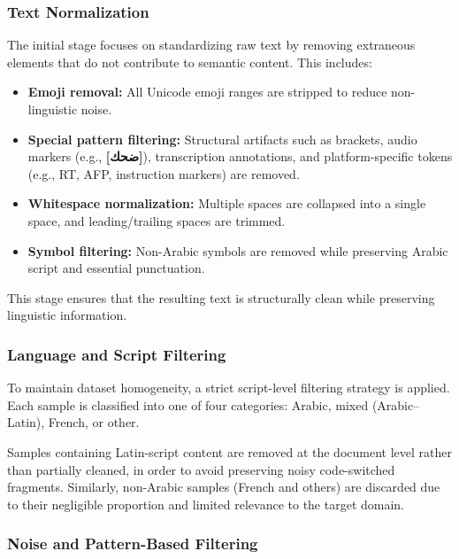 \documentclass[12pt,a4paper]{report}
\begin{document}
\subsubsection{Text Normalization}

The initial stage focuses on standardizing raw text by removing extraneous elements that do not contribute to semantic content. This includes:

\begin{itemize}
    \item \textbf{Emoji removal:} All Unicode emoji ranges are stripped to reduce non-linguistic noise.
    \item \textbf{Special pattern filtering:} Structural artifacts such as brackets, audio markers (e.g., \textbf{[ضحك]}), transcription annotations, and platform-specific tokens (e.g., RT, AFP, instruction markers) are removed.
    \item \textbf{Whitespace normalization:} Multiple spaces are collapsed into a single space, and leading/trailing spaces are trimmed.
    \item \textbf{Symbol filtering:} Non-Arabic symbols are removed while preserving Arabic script and essential punctuation.
\end{itemize}

This stage ensures that the resulting text is structurally clean while preserving linguistic information.


\subsubsection{Language and Script Filtering}

To maintain dataset homogeneity, a strict script-level filtering strategy is applied. Each sample is classified into one of four categories: Arabic, mixed (Arabic–Latin), French, or other.

Samples containing Latin-script content are removed at the document level rather than partially cleaned, in order to avoid preserving noisy code-switched fragments. Similarly, non-Arabic samples (French and others) are discarded due to their negligible proportion and limited relevance to the target domain.


\subsubsection{Noise and Pattern-Based Filtering}
\end{document}
